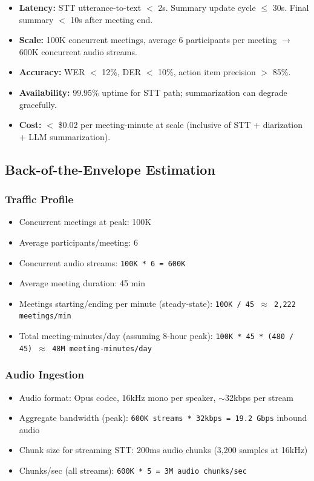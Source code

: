 \begin{itemize}
  \item \textbf{Latency:} STT utterance-to-text $<$ 2s. Summary update cycle $\leq$ 30s. Final summary $<$ 10s after meeting end.
  \item \textbf{Scale:} 100K concurrent meetings, average 6 participants per meeting $\rightarrow$ 600K concurrent audio streams.
  \item \textbf{Accuracy:} WER $<$ 12\%, DER $<$ 10\%, action item precision $>$ 85\%.
  \item \textbf{Availability:} 99.95\% uptime for STT path; summarization can degrade gracefully.
  \item \textbf{Cost:} $<$ \$0.02 per meeting-minute at scale (inclusive of STT + diarization + LLM summarization).
\end{itemize}

\subsection*{Back-of-the-Envelope Estimation}

\subsubsection*{Traffic Profile}

\begin{itemize}
  \item Concurrent meetings at peak: 100K
  \item Average participants/meeting: 6
  \item Concurrent audio streams: \texttt{100K * 6 = 600K}
  \item Average meeting duration: 45 min
  \item Meetings starting/ending per minute (steady-state): \texttt{100K / 45 $\approx$ 2,222 meetings/min}
  \item Total meeting-minutes/day (assuming 8-hour peak): \texttt{100K * 45 * (480 / 45) $\approx$ 48M meeting-minutes/day}
\end{itemize}

\subsubsection*{Audio Ingestion}

\begin{itemize}
  \item Audio format: Opus codec, 16kHz mono per speaker, $\sim$32kbps per stream
  \item Aggregate bandwidth (peak): \texttt{600K streams * 32kbps = 19.2 Gbps} inbound audio
  \item Chunk size for streaming STT: 200ms audio chunks (3,200 samples at 16kHz)
  \item Chunks/sec (all streams): \texttt{600K * 5 = 3M audio chunks/sec}
\end{itemize}

